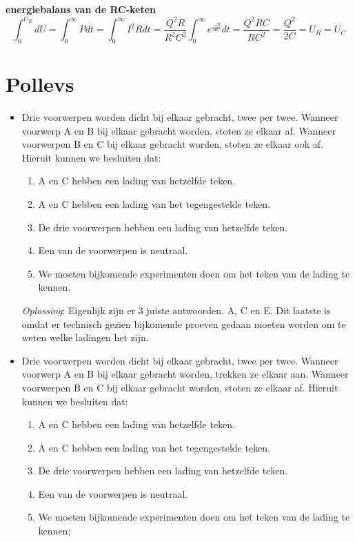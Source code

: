 \documentclass[12pt,a4paper]{article}
\begin{document}
	\textbf{energiebalans van de RC-keten}
	\[\int_{0}^{U_R }dU = \int_{0}^{\infty}Pdt = \int_{0}^{\infty} I^2Rdt = \frac{Q^2R}{R^2C^2}\int_0^\infty e^{\frac{-2t}{RC}}dt = \frac{Q^2RC}{RC^2} = \frac{Q^2}{2C} = U_R = U_C\]
  
    \section{Pollevs}
    \begin{itemize}
    \renewcommand\labelitemi{--}
    \item Drie voorwerpen worden dicht bij elkaar gebracht, twee per twee. Wanneer voorwerp A en B bij elkaar gebracht worden, stoten ze elkaar af. Wanneer voorwerpen B en C bij elkaar gebracht worden, stoten ze elkaar ook af. Hieruit kunnen we besluiten dat:
    \begin{enumerate}[label=\alph*]
    	\item A en C hebben een lading van hetzelfde teken.
    	\item A en C hebben een lading van het tegengestelde teken.
    	\item De drie voorwerpen hebben een lading van hetzelfde teken. 
    	\item Een van de voorwerpen is neutraal. 
    	\item We moeten bijkomende experimenten doen om het teken van de lading te kennen. 
    \end{enumerate}
	\textit{Oplossing}: Eigenlijk zijn er 3 juiste antwoorden. A, C en E. Dit laatste is omdat er technisch gezien bijkomende proeven gedaan moeten worden om te weten welke ladingen het zijn. 
	\newline
	\item Drie voorwerpen worden dicht bij elkaar gebracht, twee per twee. Wanneer voorwerp A en B bij elkaar gebracht worden, trekken ze elkaar aan. Wanneer voorwerpen B en C bij elkaar gebracht worden, stoten ze elkaar af. Hieruit kunnen we besluiten dat: 
	\begin{enumerate}[label=\alph*]
		\item A en C hebben een lading van hetzelfde teken. 
		\item A en C hebben een lading van het tegengestelde teken. 
		\item De drie voorwerpen hebben een lading van hetzelfde teken. 
		\item Een van de voorwerpen is neutraal. 
		\item We moeten bijkomende experimenten doen om het teken van de lading te kennen; 

\end{enumerate}
\end{itemize}
\end{document}
